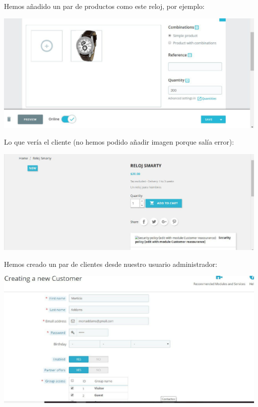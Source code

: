 \documentclass{article}
\begin{document}
Hemos añadido un par de productos como este reloj, por ejemplo:

\begin{center}
\includegraphics[scale=0.4]{images/order6.jpg}
\end{center}

Lo que vería el cliente (no hemos podido añadir imagen porque salía error):

\begin{center}
\includegraphics[scale=0.4]{images/order7.jpg}
\end{center}

Hemos creado un par de clientes desde nuestro usuario administrador:

\begin{center}
\includegraphics[scale=0.4]{images/order8.jpg}
\end{center}
\end{document}
